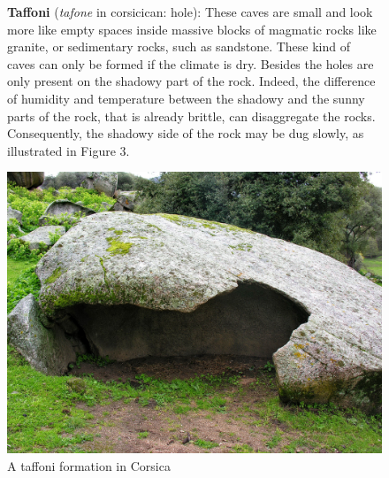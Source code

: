 \documentclass[draft, final]{report}
\begin{document}
\begin{itemize}
\begin{figure}[!ht]
  \begin{minipage}[c]{0.50\linewidth}
    \item \textbf{Taffoni} (\emph{tafone} in corsicican: hole): These caves are small and look more like empty spaces inside massive blocks of magmatic rocks like granite, or sedimentary rocks, such as sandstone. These kind of caves can only be formed if the climate is dry. Besides the holes are only present on the shadowy part of the rock. Indeed, the difference of humidity and temperature between the shadowy and the sunny parts of the rock, that is already brittle, can disaggregate the rocks. Consequently, the shadowy side of the rock may be dug slowly, as illustrated in Figure 3.
  \end{minipage}\hfill
  \begin{minipage}[c]{0.50\linewidth}
  \begin{center}
    \includegraphics[scale=0.4]{LateX/Images/taffoni.jpg}
    \caption{A taffoni formation in Corsica\cite{taffoni}}
  \end{center}
\end{minipage}
\end{figure}


\end{itemize}
\end{document}
